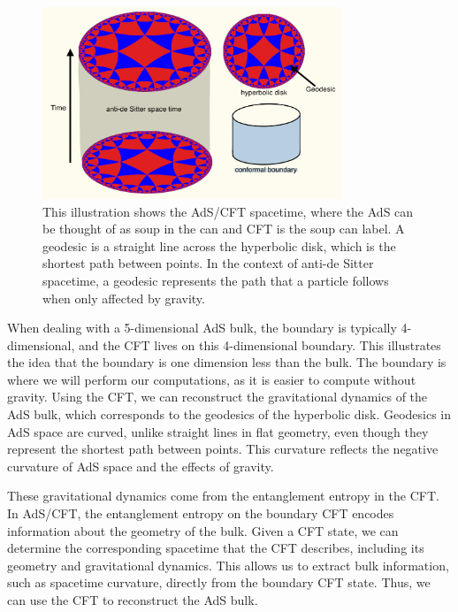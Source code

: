\documentclass[12pt]{article}
\begin{document}
        \begin{figure}[htbp]
            \centering
            \includegraphics[width=0.8\textwidth]{ads_cft.jpeg}  
            \caption{This illustration shows the AdS/CFT spacetime, where the AdS can be thought of as soup in the can and CFT is the soup can label. A geodesic is a straight line across the hyperbolic disk, which is the shortest path between points. In the context of anti-de Sitter spacetime, a geodesic represents the path that a particle follows when only affected by gravity.}  
            \label{fig:AdS/CFT space}  
        \end{figure}

        \newpage
        When dealing with a 5-dimensional AdS bulk, the boundary is typically 4-dimensional, and the CFT lives on this 4-dimensional boundary. This illustrates the idea that the boundary is one dimension less than the bulk. The boundary is where we will perform our computations, as it is easier to compute without gravity. Using the CFT, we can reconstruct the gravitational dynamics of the AdS bulk, which corresponds to the geodesics of the hyperbolic disk. Geodesics in AdS space are curved, unlike straight lines in flat geometry, even though they represent the shortest path between points. This curvature reflects the negative curvature of AdS space and the effects of gravity.

        These gravitational dynamics come from the entanglement entropy in the CFT. In AdS/CFT, the entanglement entropy on the boundary CFT encodes information about the geometry of the bulk. Given a CFT state, we can determine the corresponding spacetime that the CFT describes, including its geometry and gravitational dynamics. This allows us to extract bulk information, such as spacetime curvature, directly from the boundary CFT state. Thus, we can use the CFT to reconstruct the AdS bulk.
\end{document}
